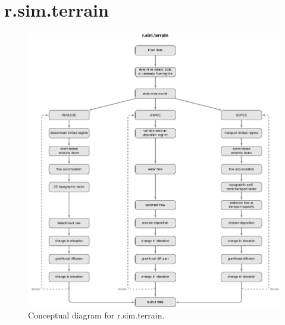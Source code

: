 \documentclass[gmd, manuscript]{copernicus}
\begin{document}
\section{r.sim.terrain}


\begin{figure}%
\center
\includegraphics[width=\textwidth,keepaspectratio]{figures/concept.pdf}
\caption{Conceptual diagram for r.sim.terrain.}
\label{fig:diagram}
\end{figure}

\end{document}
